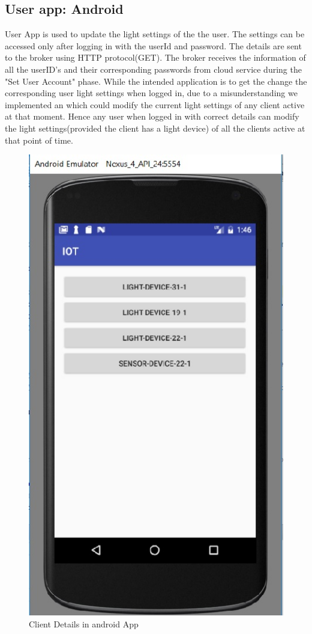 \subsection{User app: Android} 
User App is used to update the light settings of the the user. The settings can be accessed only after logging in with the userId and password. The details are sent to the broker using HTTP protocol(GET). The broker receives the information of all the userID's and their corresponding passwords from cloud service during the "Set User Account" phase. While the intended application is to get the change the corresponding user light settings when logged in, due to a misunderstanding we implemented an which could modify the current light settings of any client active at that moment. Hence any user when logged in with correct details can modify the light settings(provided the client has  a light device) of all the clients active at that point of time.

\begin{figure}[h]
	\begin{center}
		\includegraphics[width=.7\linewidth]{img/android1}
		\caption{Client Details in android App}
		\label{fig:fig3}
	\end{center}
\end{figure}


